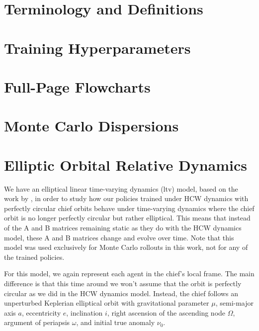 \chapter{Terminology and Definitions}
\label{appendix:glossary}



\chapter{Training Hyperparameters}
\label{appendix:hyperparameters}



\chapter{Full-Page Flowcharts}
\label{app:full_page_flowcharts}



\chapter{Monte Carlo Dispersions}
\label{appendix:dispersions}




\chapter{Elliptic Orbital Relative Dynamics}
\label{appendix:dynamics-elliptic-ltv}

We have an elliptical linear time-varying dynamics (\acs{ltv}) model, based on the work by \cite{tschauner1965rendezvous}, in order to study how our policies trained under HCW dynamics with perfectly circular chief orbits behave under time-varying dynamics where the chief orbit is no longer perfectly circular but rather elliptical. This means that instead of the A and B matrices remaining static as they do with the HCW dynamics model, these A and B matrices change and evolve over time. Note that this model was used exclusively for Monte Carlo rollouts in this work, not for any of the trained policies.

For this model, we again represent each agent in the chief's local frame. The main difference is that this time around we won't assume that the orbit is perfectly circular as we did in the HCW dynamics model. Instead, the chief follows an unperturbed Keplerian elliptical orbit with gravitational parameter $\mu$, semi-major axis $a$, eccentricity $e$, inclination $i$, right ascension of the ascending node $\Omega$, argument of periapsis $\omega$, and initial true anomaly $\nu_0$. 


